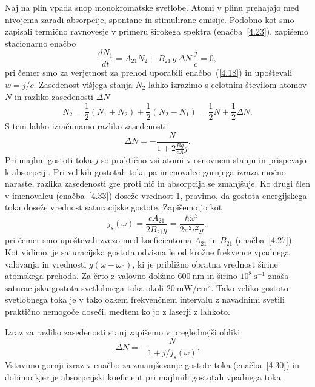 Naj na plin vpada snop monokromatske svetlobe. 
Atomi v plinu prehajajo med nivojema zaradi absorpcije, spontane in stimulirane emisije. 
Podobno kot smo zapisali termično ravnovesje v primeru
širokega spektra (enačba~\ref{4.23}), zapišemo stacionarno enačbo 
\begin{equation}
\frac{dN_{1}}{dt}=A_{21}N_{2}+B_{21}\,g\,\Delta N\,\frac{j}{c}=0,
\label{4.32}
\end{equation}
pri čemer smo za verjetnost za prehod uporabili
enačbo~(\ref{4.18}) in upoštevali $w=j/c$. Zasedenost višjega stanja $N_{2}$ lahko izrazimo s 
celotnim številom atomov $N$ in razliko zasedenosti $\Delta N$
\begin{equation}
N_{2}=\frac{1}{2}(N_1+N_2) + \frac{1}{2}(N_2-N_1) = \frac{1}{2}N+\frac{1}{2}\Delta N.
\label{4.321}
\end{equation}
S tem lahko izračunamo razliko zasedenosti 
\begin{equation}
\Delta N=-\frac{N}{1+2\frac{Bg}{cA}j}.
\label{4.33}
\end{equation}
Pri majhni gostoti toka $j$ so praktično vsi atomi v osnovnem stanju in prispevajo
k absorpciji. Pri velikih gostotah toka pa imenovalec gornjega
izraza močno naraste, razlika zasedenosti gre proti nič in absorpcija se zmanjšuje.
Ko drugi člen v imenovalcu (enačba~\ref{4.33}) doseže vrednost 1, pravimo, da
gostota energijskega toka doseže vrednost saturacijske gostote.
Zapišemo jo kot 
\begin{equation}
j_{s}(\omega)=\frac{cA_{21}}{2B_{21}g}=
\frac{\hbar\omega^{3}}{2\pi^{2}c^{2}g},
\label{4.34}
\end{equation}
pri čemer smo upoštevali zvezo med koeficientoma $A_{21}$ in $B_{21}$
(enačba~\ref{4.27}).
Kot vidimo, je saturacijska gostota odvisna le od krožne frekvence vpadnega valovanja 
in vrednosti $g(\omega - \omega_0)$, ki je približno obratna vrednost širine atomskega 
prehoda. Za črto z valovno dolžino $600~\si{\nano\metre}$ 
in širino $10^{8}~\si{\second}^{-1}$ znaša saturacijska gostota svetlobnega toka okoli 
$20~\si{\milli\watt/\centi\metre^2}$. Tako veliko gostoto svetlobnega toka je v tako ozkem
frekvenčnem intervalu z navadnimi svetili praktično nemogoče doseči, 
medtem ko jo z laserji z lahkoto.

Izraz za razliko zasedenosti stanj zapišemo v preglednejši obliki
\begin{equation}
\Delta N=-\frac{N}{1+j/j_{s}(\omega)}.
\label{4.35}
\end{equation}
Vstavimo gornji izraz v enačbo za zmanjševanje gostote toka (enačba~\ref{4.30}) in dobimo
kjer je 
absorpcijski koeficient pri majhnih gostotah vpadnega toka.

